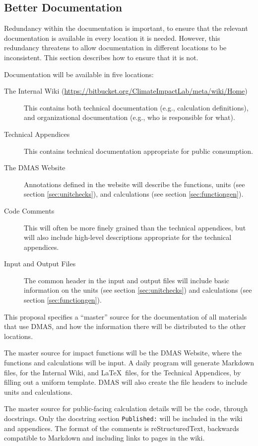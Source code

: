 \documentclass[12pt, oneside]{amsart}
\begin{document}
\subsection{Better Documentation}
\label{sec:betterdocs}

Redundancy within the documentation is important, to ensure that the relevant documentation is available in every location it is needed.  However, this redundancy threatens to allow documentation in different locations to be inconsistent.  This section describes how to ensure that it is not.

Documentation will be available in five locations:
\begin{description}
\item[The Internal Wiki (\url{https://bitbucket.org/ClimateImpactLab/meta/wiki/Home})] This contains both technical documentation (e.g., calculation definitions), and organizational documentation (e.g., who is responsible for what).
\item[Technical Appendices] This contains technical documentation appropriate for public consumption.
\item[The DMAS Website] Annotations defined in the website will describe the functions, units (see section \ref{sec:unitchecks}), and calculations (see section \ref{sec:functiongen}).
\item[Code Comments] This will often be more finely grained than the technical appendices, but will also include high-level descriptions appropriate for the technical appendices.
\item[Input and Output Files] The common header in the input and output files will include basic information on the units (see section \ref{sec:unitchecks}) and calculations (see section \ref{sec:functiongen}).
\end{description}

This proposal specifies a ``master'' source for the documentation of all materials that use DMAS, and how the information there will be distributed to the other locations.

The master source for impact functions will be the DMAS Website, where the functions and calculations will be input.  A daily program will generate Markdown files, for the Internal Wiki, and \LaTeX\ files, for the Technical Appendices, by filling out a uniform template.  DMAS will also create the file headers to include units and calculations.

The master source for public-facing calculation details will be the code, through docstrings.  Only the docstring section {\tt Published:} will be included in the wiki and appendices.  The format of the comments is reStructuredText, backwards compatible to Markdown and including links to pages in the wiki.
\end{document}
